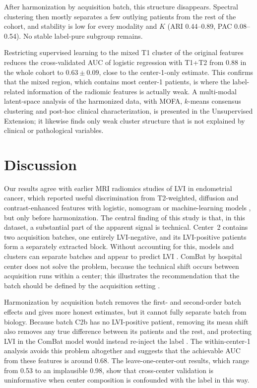 \documentclass[conference]{IEEEtran}
\begin{document}
After harmonization by acquisition batch, this structure disappears. Spectral clustering then mostly separates a few outlying patients from the rest of the cohort, and stability is low for every modality and $K$ (ARI 0.44–0.89, PAC 0.08–0.54). No stable label-pure subgroup remains.

Restricting supervised learning to the mixed T1 cluster of the original features reduces the cross-validated AUC of logistic regression with T1+T2 from 0.88 in the whole cohort to $0.63 \pm 0.09$, close to the center-1-only estimate. This confirms that the mixed region, which contains most center-1 patients, is where the label-related information of the radiomic features is actually weak. A multi-modal latent-space analysis of the harmonized data, with MOFA, $k$-means consensus clustering and post-hoc clinical characterization, is presented in the Unsupervised Extension; it likewise finds only weak cluster structure that is not explained by clinical or pathological variables.

\section{Discussion}

Our results agree with earlier MRI radiomics studies of LVI in endometrial cancer, which reported useful discrimination from T2-weighted, diffusion and contrast-enhanced features with logistic, nomogram or machine-learning models \cite{luo2020multiparametric,long2021mri,liu2024multimodal,ma2025predictive}, but only before harmonization. The central finding of this study is that, in this dataset, a substantial part of the apparent signal is technical. Center~2 contains two acquisition batches, one entirely LVI-negative, and its LVI-positive patients form a separately extracted block. Without accounting for this, models and clusters can separate batches and appear to predict LVI \cite{leek2010tackling}. ComBat by hospital center does not solve the problem, because the technical shift occurs between acquisition runs within a center; this illustrates the recommendation that the batch should be defined by the acquisition setting \cite{orlhac2022guide}.

Harmonization by acquisition batch removes the first- and second-order batch effects and gives more honest estimates, but it cannot fully separate batch from biology. Because batch C2b has no LVI-positive patient, removing its mean shift also removes any true difference between its patients and the rest, and protecting LVI in the ComBat model would instead re-inject the label \cite{nygaard2016methods}. The within-center-1 analysis avoids this problem altogether and suggests that the achievable AUC from these features is around 0.68. The leave-one-center-out results, which range from 0.53 to an implausible 0.98, show that cross-center validation is uninformative when center composition is confounded with the label in this way.
\end{document}
